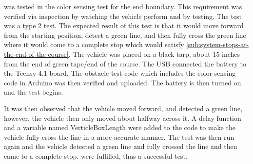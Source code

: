 \documentclass[11pt]{report}
\begin{document}
\label{tst:color-sensing-for-end-boundaries}
 was tested in the color sensing test for the end boundary. This requirement was verified via inspection by watching the vehicle perform and by testing. The test was a type 2 test. The expected result of this test is that it would move forward from the starting position, detect a green line, and then fully cross the green line where it would come to a complete stop which would satisfy \cref{sub:system-stops-at-the-end-of-the-course}. The vehicle was placed on a black tarp, about 15 inches from the end of green tape/end of the course. The USB connected the battery to the Teensy 4.1 board. The obstacle test code which includes the color sensing code in Arduino was then verified and uploaded. The battery is then turned on and the test begins.

It was then observed that the vehicle moved forward, and detected a green line, however, the vehicle then only moved about halfway across it. A delay function and a variable named VerticleBoxLength were added to the code to make the vehicle fully cross the line in a more accurate manner. The test was then run again and the vehicle detected a green line and fully crossed the line and then came to a complete stop.  were fulfilled, thus a successful test. 
\end{document}
